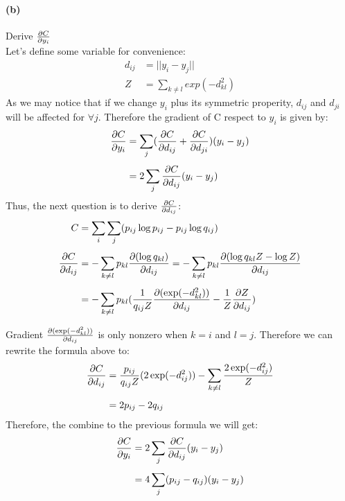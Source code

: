 \documentclass{article}
\begin{document}
\paragraph{(b)} Derive ${\partial C \over \partial y_i}$\\
Let's define some variable for convenience:
\begin{equation}
\begin{aligned}
d_{ij} &= ||y_i-y_j|| \\[0.4em]
Z &= \displaystyle\sum_{k \neq l} exp(-d_{kl}^2)
\end{aligned}
\end{equation}
As we may notice that if we change $y_i$ plus its symmetric properity, $d_{ij}$ and $d_{ji}$ will be affected for $\forall j$. Therefore the gradient of C respect to $y_i$ is given by:
\begin{equation}
\begin{aligned}
{\partial C \over \partial y_i} &= \displaystyle\sum_{j} ( {\partial C \over \partial d_{ij}} + {\partial C \over \partial d_{ji}} ) (y_i - y_j) \\[0.4em]
&= 2 \displaystyle\sum_{j} {\partial C \over \partial d_{ij}}(y_i - y_j)
\end{aligned}
\end{equation}
Thus, the next question is to derive ${\partial C \over \partial d_{ij}}$:
\begin{equation}
\begin{aligned}
C &= \displaystyle\sum_{i} \sum_{j}(p_{ij}\log p_{ij} - p_{ij}\log q_{ij}) \\[0.4em]
{\partial C \over \partial d_{ij}} &= - \displaystyle\sum_{k \neq l}p_{kl}{\partial(\log q_{kl})\over \partial d_{ij}} = - \displaystyle\sum_{k \neq l}p_{kl}{\partial(\log q_{kl}Z - \log Z)\over \partial d_{ij}} \\[0.4em]
&= - \displaystyle\sum_{k \neq l} p_{kl}({1\over q_{ij}Z} {\partial (\exp(-d_{kl}^2)) \over \partial d_{ij} } - {1\over Z}{\partial Z \over \partial d_{ij}} ) \\[0.4em]
\end{aligned}
\end{equation}
Gradient ${\partial (\exp(-d_{kl}^2)) \over \partial d_{ij} }$ is only nonzero when $k = i$ and $l = j$. Therefore we can rewrite the formula above to:
\begin{equation}
\begin{aligned}
{\partial C \over \partial d_{ij}} &= {p_{ij}\over q_{ij}Z}(2 \exp(-d_{ij}^2)) - \displaystyle\sum_{k \neq l} {2\exp (-d_{ij}^2)\over Z}\\[0.4em]
&= 2p_{ij} - 2q_{ij}
\end{aligned}
\end{equation}
Therefore, the combine to the previous formula we will get:
\begin{equation}
\begin{aligned}
{\partial C \over \partial y_i} &= 2 \displaystyle\sum_{j} {\partial C \over \partial d_{ij}}(y_i - y_j) \\[0.4em]
&= 4 \displaystyle\sum_{j}(p_{ij}-q_{ij}) (y_i -y_j)

\end{aligned}
\end{equation}
\end{document}
